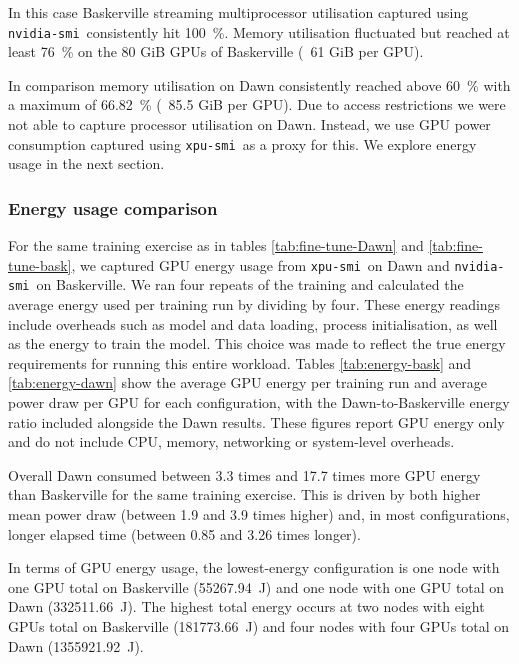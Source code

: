 In this case Baskerville streaming multiprocessor utilisation captured using {\tt nvidia-smi}\ consistently hit \qty{100}{\percent}. Memory utilisation fluctuated but reached at least \qty{76}{\percent} on the 80 GiB GPUs of Baskerville (\ie\ 61 GiB per GPU).

In comparison memory utilisation on Dawn consistently reached above \qty{60}{\percent} with a maximum of \qty{66.82}{\percent} (\ie\ 85.5 GiB per GPU). Due to access restrictions we were not able to capture processor utilisation on Dawn. Instead, we use GPU power consumption captured using {\tt xpu-smi}\ as a proxy for this. We explore energy usage in the next section.

\subsubsection{Energy usage comparison}
\label{section:energy-comparison}

For the same training exercise as in tables \ref{tab:fine-tune-Dawn} and \ref{tab:fine-tune-bask}, we captured GPU energy usage from {\tt xpu-smi}\ on Dawn and {\tt nvidia-smi}\ on Baskerville. We ran four repeats of the training and calculated the average energy used per training run by dividing by four. These energy readings include overheads such as model and data loading, process initialisation, as well as the energy to train the model. This choice was made to reflect the true energy requirements for running this entire workload. Tables \ref{tab:energy-bask} and \ref{tab:energy-dawn} show the average GPU energy per training run and average power draw per GPU for each configuration, with the Dawn-to-Baskerville energy ratio included alongside the Dawn results. These figures report GPU energy only and do not include CPU, memory, networking or system-level overheads.

Overall Dawn consumed between 3.3 times and 17.7 times more GPU energy than Baskerville for the same training exercise. This is driven by both higher mean power draw (between 1.9 and 3.9 times higher) and, in most configurations, longer elapsed time (between 0.85 and 3.26 times longer).

In terms of GPU energy usage, the lowest-energy configuration is one node with one GPU total on Baskerville (\qty{55267.94}{\joule}) and one node with one GPU total on Dawn (\qty{332511.66}{\joule}). The highest total energy occurs at two nodes with eight GPUs total on Baskerville (\qty{181773.66}{\joule}) and four nodes with four GPUs total on Dawn (\qty{1355921.92}{\joule}).

